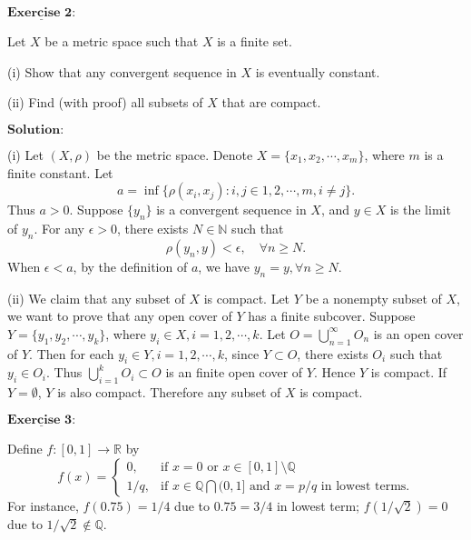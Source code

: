 \documentclass[12pt,a4paper]{ctexart}
\begin{document}
\newpage 

$\underline{\textbf{Exercise 2:}}$

Let $X$ be a metric space such that $X$ is a finite set.

(i) Show that any convergent sequence in $X$ is eventually constant.

(ii) Find (with proof) all subsets of $X$ that are compact.

\vspace{8pt}
$\textbf{Solution:}$

(i) Let $(X, \rho)$ be the metric space. Denote $X = \{x_1, x_2, \cdots, x_m \}$, where $m$ is a finite constant. Let
\begin{equation*}
    a = \inf \{\rho(x_i, x_j): i, j \in 1, 2, \cdots, m, i \neq j\}.
\end{equation*}
Thus $a > 0$. Suppose $\{y_n\}$ is a convergent sequence in $X$, and $y \in X$ is the limit of $y_n$. For any $\epsilon > 0$, there exists $N \in \mathbb N$ such that
$$\rho(y_n, y) < \epsilon, \quad \forall n \geq N.$$
When $\epsilon < a$, by the definition of $a$, we have $y_n = y, \forall n \geq N$.

\vspace{6pt}

(ii) We claim that any subset of $X$ is compact. Let $Y$ be a nonempty subset of $X$, we want to prove that any open cover of $Y$ has a finite subcover. Suppose $Y = \{y_1, y_2, \cdots, y_k \}$, where $y_i \in X, i = 1, 2, \cdots, k$. Let $O = \bigcup_{n = 1}^{\infty} O_{n}$ is an open cover of $Y$. Then for each $y_i \in Y, i = 1, 2, \cdots, k$, since $Y \subset O$, there exists $O_{i}$ such that $y_i \in O_i$. Thus $\bigcup_{i = 1}^{k} O_{i} \subset O$ is an finite open cover of $Y$. Hence $Y$ is compact. If $Y = \emptyset$, $Y$ is also compact. Therefore any subset of $X$ is compact.


\newpage 

$\underline{\textbf{Exercise 3:}}$

Define $f: [0,1] \to \mathbb R$ by
\begin{equation*}
f(x) =
\left\{
             \begin{array}{cl}
             0, &  \text{if $x = 0$ or $x \in [0,1] \setminus \mathbb Q$}  \\
             1/q, & \text{if $x \in \mathbb Q \bigcap (0,1]$ and $x = p/q$ in lowest terms}.
             \end{array}
\right.
\end{equation*}
For instance, $f(0.75) =1/4$ due to $0.75 = 3/4$ in lowest term; $f(1/\sqrt{2}) = 0$ due to $1/ \sqrt{2} \notin \mathbb Q$.
\end{document}
